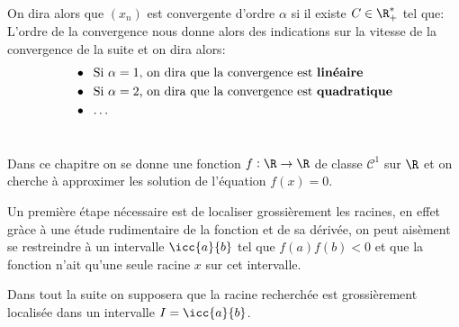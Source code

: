 On dira alors que \((x_n)\) est convergente d'ordre \(\alpha\) si il existe \(C \in \R_+^*\) tel que:
L'ordre de la convergence nous donne alors des indications sur la vitesse de la convergence de la suite et on dira alors:
\begin{align*}
   &\bullet \;\; \text{Si \(\alpha = 1\), on dira que la convergence est \textbf{linéaire}}\\
   &\bullet \;\; \text{Si \(\alpha = 2\), on dira que la convergence est \textbf{quadratique}}\\
   &\bullet \;\; \text{\ldots}
\end{align*}

\chapter*{}
Dans ce chapitre on se donne une fonction \(f : \R \rightarrow \R\) de classe \(\mathcal{C}^1\) sur \(\R\) et on cherche à approximer les solution de l'équation \(f(x) = 0\).\<

Un première étape nécessaire est de localiser grossièrement les racines, en effet gràce à une étude rudimentaire de la fonction et de sa dérivée, on peut aisèment se restreindre à un intervalle \(\icc{a}{b}\) tel que \(f(a)f(b) < 0\) et que la fonction n'ait qu'une seule racine \(x\) sur cet intervalle.\+

Dans tout la suite on supposera que la racine recherchée est grossièrement localisée dans un intervalle \(I = \icc{a}{b}\).

